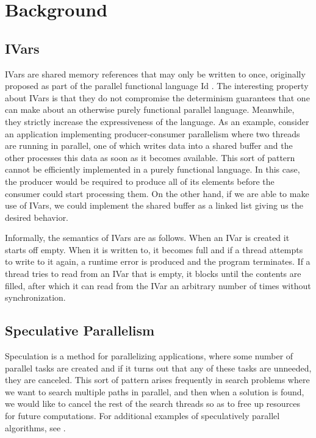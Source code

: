 \section{Background}
\subsection{IVars}

IVars are shared memory references that may only be written to once, originally proposed as part of the parallel functional language Id \cite{i-structures}.  The interesting property about IVars is that they do not compromise the determinism guarantees that one can make about an otherwise purely functional parallel language.  Meanwhile, they strictly increase the expressiveness of the language.  As an example, consider an application implementing producer-consumer parallelism where two threads are running in parallel, one of which writes data into a shared buffer and the other processes this data as soon as it becomes available.  This sort of pattern cannot be efficiently implemented in a purely functional language.  In this case, the producer would be required to produce all of its elements before the consumer could start processing them.  On the other hand, if we are able to make use of IVars, we could implement the shared buffer as a linked list giving us the desired behavior.

Informally, the semantics of IVars are as follows.  When an IVar is created it starts off empty. When it is written to, it becomes full and if a thread attempts to write to it again, a runtime error is produced and the program terminates.  If a thread tries to read from an IVar that is empty, it blocks until the contents are filled, after which it can read from the IVar an arbitrary number of times without synchronization.  

\subsection{Speculative Parallelism}
Speculation is a method for parallelizing applications, where some number of parallel tasks are created and if it turns out that any of these tasks are unneeded, they are canceled.  This sort of pattern arises frequently in search problems where we want to search multiple paths in parallel, and then when a solution is found, we would like to cancel the rest of the search threads so as to free up resources for future computations.  For additional examples of speculatively parallel algorithms, see \cite{programmable-spec-par, burton-spec-par,spec-lexical-analysis}.

